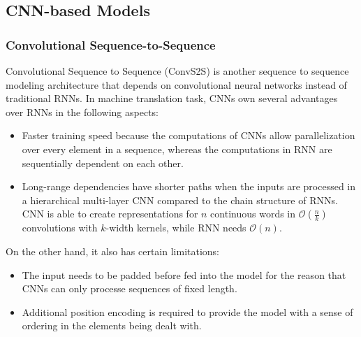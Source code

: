 \subsection{CNN-based Models}

\subsubsection*{Convolutional Sequence-to-Sequence}

Convolutional Sequence to Sequence (ConvS2S) \cite{gehring2017convs2s} is another sequence to sequence modeling architecture that depends on convolutional neural networks instead of traditional RNNs. In machine translation task, CNNs own several advantages over RNNs in the following aspects:
\begin{itemize}
\item Faster training speed because the computations of CNNs allow parallelization over every element in a sequence, whereas the computations in RNN are sequentially dependent on each other.
\item Long-range dependencies have shorter paths when the inputs are processed in a hierarchical multi-layer CNN compared to the chain structure of RNNs. CNN is able to create representations for $ n $ continuous words in $ \mathcal{O}(\frac{n}{k}) $ convolutions with $ k $-width kernels, while RNN needs $ \mathcal{O}(n) $.
\end{itemize}
On the other hand, it also has certain limitations:
\begin{itemize}
\item The input needs to be padded before fed into the model for the reason that CNNs can only processe sequences of fixed length.
\item Additional position encoding is required to provide the model with a sense of ordering in the elements being dealt with.
\end{itemize}

